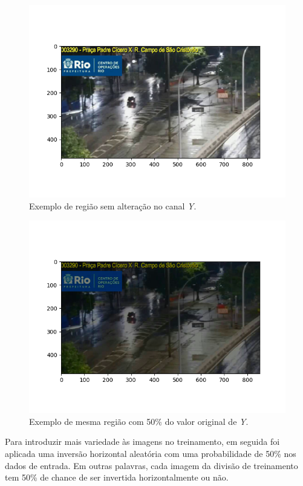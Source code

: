 \begin{figure}[htb]
    \centerline{\includegraphics[width=1\linewidth]{images/metodologia/samplebright.png}}
    \caption{Exemplo de região sem alteração no canal \textit{Y}.}
    \label{fig:samplebright}
\end{figure}
\begin{figure}[htb]
    \centerline{\includegraphics[width=1\linewidth]{images/metodologia/samplebright_half.png}}
    \caption{Exemplo de mesma região com 50\% do valor original de \textit{Y}.}
    \label{fig:samplebright_half}
\end{figure}

Para introduzir mais variedade às imagens no treinamento, em seguida foi aplicada uma inversão horizontal aleatória com uma probabilidade de 50\% nos dados de entrada.
Em outras palavras, cada imagem da divisão de treinamento tem 50\% de chance de ser invertida horizontalmente ou não.

